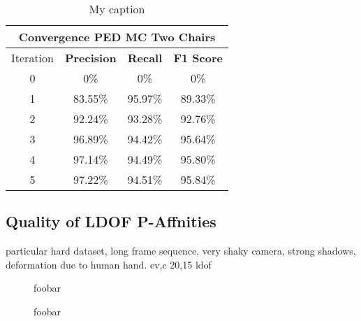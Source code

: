 \begin{table}[H]
\centering
\begin{tabular}{|c|c|c|c|}
\hline
\multicolumn{4}{|c|}{Convergence PED MC Two Chairs}                        \\ \hline
Iteration & \textbf{Precision} & \textbf{Recall} & \textbf{F1 Score} \\ \hline
0 & 0\%   & 0\%     & 0\%  \\ \hline
1 & 83.55\%   & 95.97\%     & 89.33\%  \\ \hline
2 & 92.24\%   & 93.28\%     & 92.76\%  \\ \hline 
3 & 96.89\%   & 94.42\%     & 95.64\%  \\ \hline
4 & 97.14\%   & 94.49\%     & 95.80\%  \\ \hline
5 & 97.22\%   & 94.51\%     & 95.84\%  \\ \hline               
\end{tabular}
\caption[Convergence PED MC]{My caption}
\label{tab:two_chairs_ped_mc_iterations}
\end{table}

\subsection{Quality of LDOF P-Affnities}
particular hard dataset, long frame sequence, very shaky camera, strong shadows, deformation due to human hand.
ev,c
20,15
ldof

\begin{figure}[H]
\begin{center}
\end{center}
\caption[Bonn Cerealbox Dataset]{foobar}
\label{fig:bonn_cerealbox_ds}
\end{figure}

\begin{figure}[H]
\begin{center}
\end{center}
\caption[Bonn Cerealbox Segmentations]{foobar}
\label{fig:bonn_cerealbox_segmentations_mc_methods}
\end{figure}


